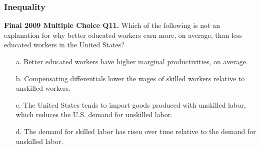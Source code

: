 \documentclass[12pt, xcolor=dvipsnames]{beamer}
\begin{document}
\begin{frame}
\frametitle{\bf Inequality}
\small \textsf{\bfseries Final 2009 Multiple Choice Q11.} 
Which of the following is not an explanation for why better educated workers earn more, on
average, than less educated workers in the United States?
\begin{enumerate}\itemsep-0.5ex
\item[a.] Better educated workers have higher marginal productivities, on average.
\item[b.] Compensating differentials lower the wages of skilled workers relative to unskilled workers.
\item[c.] The United States tends to import goods produced with unskilled labor, which reduces the U.S. demand for unskilled labor.
\item[d.] The demand for skilled labor has risen over time relative to the demand for unskilled labor. 
\end{enumerate}
\end{frame}
\end{document}
